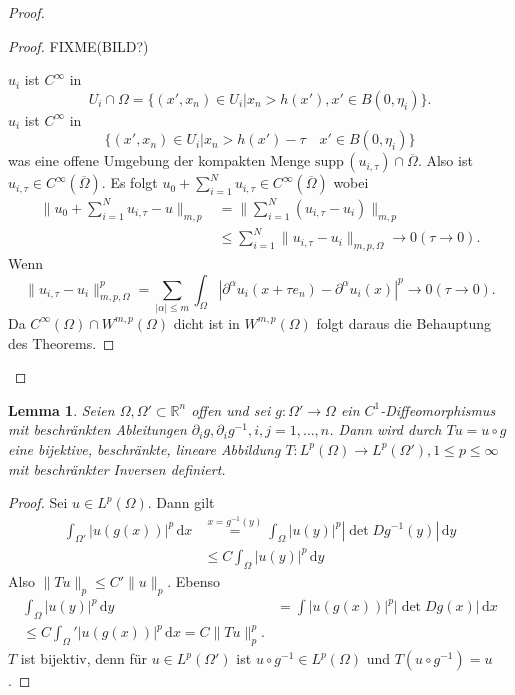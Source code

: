 \documentclass[
paper=a4,
bibtotocnumbered,
liststotocnumbered,
tablecaptionabove,
pointlessnumbers,
twoside,
openright,
10pt
]
{report}
\newcommand{\supp}{\mathrm{supp}\,}
\newtheorem{lem}[thm]{Lemma}
\theoremstyle{definition}
\numberwithin{equation}{chapter}
\begin{document}
\begin{proof}
\begin{proof}
FIXME(BILD?)

$u_i$ ist $C^\infty$ in 
\begin{equation}
U_i \cap \Omega = \{(x', x_n) \in U_i | x_n > h(x'), x' \in B(0,\eta_i)\}.
\end{equation} 
$u_i$ ist $C^\infty$ in 
\begin{equation}
 \{(x', x_n) \in U_i | x_n > h(x') - \tau \quad x'\in B(0,\eta_i)\}
\end{equation}
was eine offene Umgebung der kompakten Menge $\supp(u_{i,\tau}) \cap \overline{\Omega}$. Also ist $u_{i,\tau}\in C^\infty(\overline{\Omega})$. Es folgt $u_0 + \sum_{i=1}^N u_{i,\tau} \in C^\infty(\overline{\Omega})$ wobei
\begin{align*}
 \| u_0 + \sum_{i=1}^N u_{i,\tau} -u\|_{m,p} &= \| \sum_{i=1}^N (u_{i,\tau} - u_i)\|_{m,p}\\
 &\le \sum_{i=1}^N \| u_{i,\tau} - u_i \|_{m,p, \Omega} \to 0 (\tau \to 0).
\end{align*}
Wenn
\begin{equation}
 \| u_{i,\tau} - u_i \|^p_{m,p, \Omega} = \sum_{|\alpha|\le m} \int_\Omega | \partial^\alpha u_i (x+ \tau e_n) - \partial^\alpha u_i (x)|^p \to 0 (\tau \to 0). 
\end{equation}
Da $C^\infty(\Omega) \cap W^{m,p}(\Omega)$ dicht ist in $W^{m,p}(\Omega)$ folgt daraus die Behauptung des Theorems.
\end{proof}
\end{proof}

\begin{lem}\label{4.2}
 Seien $\Omega, \Omega'\subset \mathbb R^n$ offen und sei $g: \Omega' \to \Omega$ ein $C^1$-Diffeomorphismus
 mit beschränkten Ableitungen $\partial_i g, \partial_i g^{-1}, i,j=1,\ldots, n$. Dann wird durch $Tu=u\circ g$
 eine bijektive, beschränkte, lineare Abbildung $T: L^p(\Omega) \to L^p(\Omega'), 1 \le p \le \infty$ mit beschränkter Inversen definiert.
\end{lem}
\begin{proof}
 Sei $u\in L^p(\Omega)$. Dann gilt 
 \begin{align*}
  \int_{\Omega'} |u(g(x))|^p\, \mathrm dx &\stackrel{x=g^{-1}(y)}{=} \int_\Omega |u(y)|^p | \det Dg^{-1}(y)|\,\mathrm dy\\
  &\le C\int_\Omega |u(y)|^p\, \mathrm dy
 \end{align*}
Also $\|Tu\|_p \le C' \|u\|_p$.  Ebenso
\begin{align*}
 \int_\Omega |u(y)|^p\, \mathrm dy &= \int |u(g(x))|^p |\det Dg(x)|\,\mathrm dx \\
 \le C\int_\Omega' |u(g(x))|^p\, \mathrm dx = C\|Tu\|_p^p.
\end{align*}
$T$ ist bijektiv, denn für $u\in L^p(\Omega')$ ist $u\circ g^{-1} \in L^p(\Omega)$ und  $T(u\circ g^{-1})=u$.
\end{proof}
\end{document}
